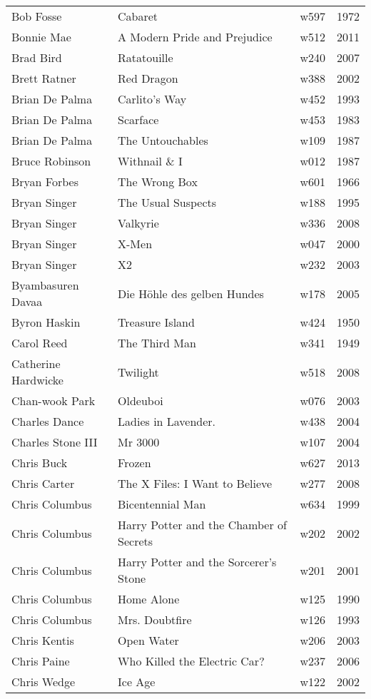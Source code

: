 \documentclass{article}
\begin{document}
\begin {center}
\begin{longtable}{l p{10cm} l l}
Bob Fosse & Cabaret & w597 & 1972 \\
Bonnie Mae & A Modern Pride and Prejudice & w512 & 2011 \\
Brad Bird & Ratatouille & w240 & 2007 \\
Brett Ratner & Red Dragon & w388 & 2002 \\
Brian De Palma & Carlito's Way & w452 & 1993 \\
Brian De Palma & Scarface & w453 & 1983 \\
Brian De Palma & The Untouchables & w109 & 1987 \\
Bruce Robinson & Withnail \& I & w012 & 1987 \\
Bryan Forbes & The Wrong Box & w601 & 1966 \\
Bryan Singer & The Usual Suspects & w188 & 1995 \\
Bryan Singer & Valkyrie & w336 & 2008 \\
Bryan Singer & X-Men & w047 & 2000 \\
Bryan Singer & X2 & w232 & 2003 \\
Byambasuren Davaa & Die Höhle des gelben Hundes & w178 & 2005 \\
Byron Haskin & Treasure Island & w424 & 1950 \\
Carol Reed & The Third Man & w341 & 1949 \\
Catherine Hardwicke & Twilight & w518 & 2008 \\
Chan-wook Park & Oldeuboi & w076 & 2003 \\
Charles Dance & Ladies in Lavender. & w438 & 2004 \\
Charles Stone III & Mr 3000 & w107 & 2004 \\
Chris Buck & Frozen & w627 & 2013 \\
Chris Carter & The X Files: I Want to Believe & w277 & 2008 \\
Chris Columbus & Bicentennial Man & w634 & 1999 \\
Chris Columbus & Harry Potter and the Chamber of Secrets & w202 & 2002 \\
Chris Columbus & Harry Potter and the Sorcerer's Stone & w201 & 2001 \\
Chris Columbus & Home Alone & w125 & 1990 \\
Chris Columbus & Mrs. Doubtfire & w126 & 1993 \\
Chris Kentis & Open Water & w206 & 2003 \\
Chris Paine & Who Killed the Electric Car? & w237 & 2006 \\
Chris Wedge & Ice Age & w122 & 2002 \\

\end{longtable}
\end{center}
\end{document}
